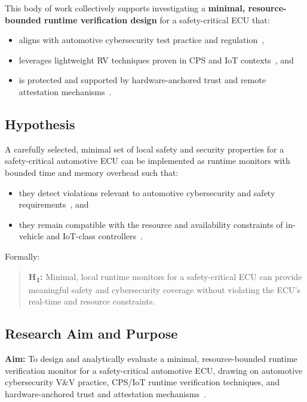 This body of work collectively supports investigating a \textbf{minimal, resource-bounded runtime verification design} for a safety-critical ECU that:
\begin{itemize}
  \item aligns with automotive cybersecurity test practice and regulation~\cite{ekert2021cybersecurity},
  \item leverages lightweight RV techniques proven in CPS and IoT contexts~\cite{krichen2023survey,zhang2024context,dehoz2022iotdt}, and
  \item is protected and supported by hardware-anchored trust and remote attestation mechanisms~\cite{saadat2024rosmonitoring2,plappert2023hta}.
\end{itemize}

\subsection{Hypothesis}

A carefully selected, minimal set of local safety and security properties for a safety-critical automotive ECU can be implemented as runtime monitors with bounded time and memory overhead such that:

\begin{itemize}
  \item they detect violations relevant to automotive cybersecurity and safety requirements~\cite{ekert2021cybersecurity,krichen2023survey,zhang2024context,dehoz2022iotdt,lorych2024hta}, and
  \item they remain compatible with the resource and availability constraints of in-vehicle and IoT-class controllers~\cite{williams2022survey,saadat2024rosmonitoring2,plappert2023hta}.
\end{itemize}

Formally:

\begin{quote}
\textbf{H\textsubscript{1}:} Minimal, local runtime monitors for a safety-critical ECU can provide meaningful safety and cybersecurity coverage without violating the ECU's real-time and resource constraints.
\end{quote}

\subsection{Research Aim and Purpose}

\textbf{Aim:} To design and analytically evaluate a minimal, resource-bounded runtime verification monitor for a safety-critical automotive ECU, drawing on automotive cybersecurity V\&V practice, CPS/IoT runtime verification techniques, and hardware-anchored trust and attestation mechanisms~\cite{ekert2021cybersecurity,zhang2024context,dehoz2022iotdt,lorych2024hta,saadat2024rosmonitoring2,plappert2023hta}.


